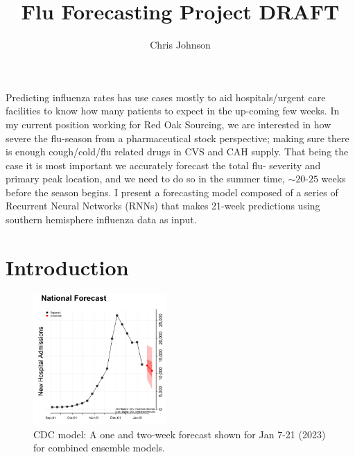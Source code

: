 \documentclass[12pt,a4paper,english]{article}
\begin{document}
\title{Flu Forecasting Project DRAFT}
\author{Chris Johnson}
\maketitle

Predicting influenza rates has use cases mostly to aid hospitals/urgent care facilities to know how many patients to expect in the up-coming few weeks. In my current position working for Red Oak Sourcing, we are interested in how severe the flu-season from a pharmaceutical stock perspective; making sure there is enough cough/cold/flu related drugs in CVS and CAH supply. That being the case it is most important we accurately forecast the total flu- severity and primary peak location, and we need to do so in the summer time, $\sim 20$-$25$ weeks before the season begins. I present a forecasting model composed of a series of Recurrent Neural Networks (RNNs) that makes 21-week predictions using southern hemisphere influenza data as input.

\section{Introduction}




\begin{figure}[h]
		\begin{center}
		\includegraphics[width=0.45\textwidth]{Pictures/cdc_model.png}
		\caption{CDC model: A one and two-week forecast shown for Jan 7-21 (2023) for combined ensemble models.}
		\end{center}
		\label{fig:cdcc}
	\end{figure}

	
\FloatBarrier
\end{document}
